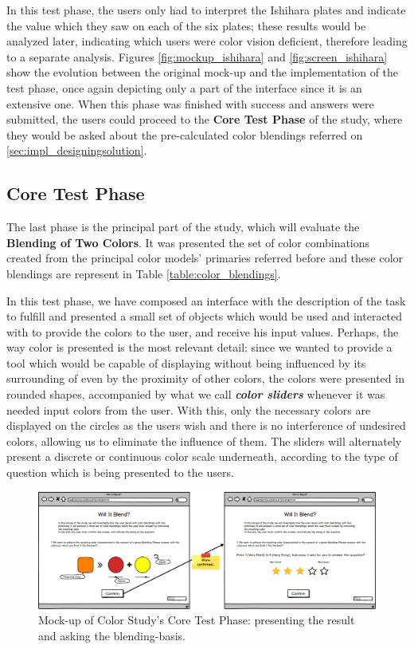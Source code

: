 %
In this test phase, the users only had to interpret the Ishihara plates and indicate the value which they saw on each of the six plates; these results would be
analyzed later, indicating which users were color vision deficient, therefore leading to a separate analysis. Figures \ref{fig:mockup_ishihara} and
\ref{fig:screen_ishihara} show the evolution between the original mock-up and the implementation of the test phase, once again depicting only a part of the
interface since it is an extensive one.
%
When this phase was finished with success and answers were submitted, the users could proceed to the \textbf{Core Test Phase} of the study, where they would be asked
about the pre-calculated color blendings referred on \ref{sec:impl_designingsolution}.
%
%
\subsection{Core Test Phase}
\label{subsec:design_core}
%
The last phase is the principal part of the study, which will evaluate the \textbf{Blending of Two Colors}. It was presented the set of color combinations
created from the principal color models' primaries referred before and these color blendings are represent in Table \ref{table:color_blendings}. \par
%
In this test phase, we have composed an interface with the description of the task to fulfill and presented a small set of objects which would be used and
interacted with to provide the colors to the user, and receive his input values. Perhaps, the way color is presented is the most relevant detail: since we
wanted to provide a tool which would be capable of displaying without being influenced by its surrounding of even by the proximity of other colors, the colors
were presented in rounded shapes, accompanied by what we call \emph{\textbf{color sliders}} whenever it was needed input colors from the user. With this,
only the necessary colors are displayed on the circles as the users wish and there is no interference of undesired colors, allowing us to eliminate the
influence of them. The sliders will alternately present a discrete or continuous color scale underneath, according to the type of question which is being
presented to the users. \par
%
\begin{figure}[htbp]
	\centering
  \includegraphics[width=\textwidth]{images/implementation/mockup_core_objTwoColors.png}
  \caption[Mock-up of Color Study's Core Test Phase: present the result and ask the blending-basis.]{Mock-up of Color Study's Core
	Test Phase: presenting the result and asking the blending-basis.}
  \label{fig:mockup_core_1}
\end{figure} \par
